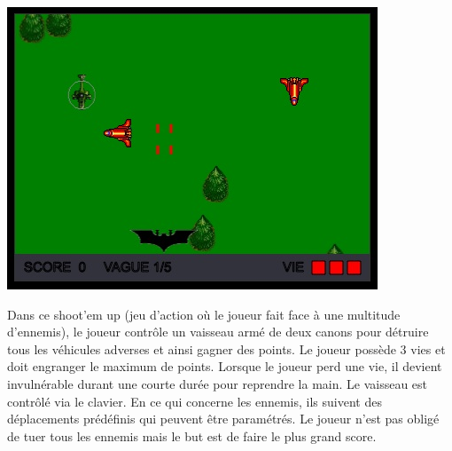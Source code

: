 \begin{minipage}{6cm}
\includegraphics[width=\linewidth]{img/capturejeu_1942}
\end{minipage}
\hfill
\begin{minipage}{9cm}
Dans ce shoot'em up (jeu d’action où le joueur fait face à une multitude d’ennemis), 
le joueur contrôle un vaisseau armé de deux canons pour détruire tous les véhicules adverses et ainsi gagner des points. 
Le joueur possède 3 vies et doit engranger le maximum de points. Lorsque le joueur perd une vie, il devient invulnérable durant une courte durée 
pour reprendre la main. Le vaisseau est contrôlé via le clavier. En ce qui concerne les ennemis, 
ils suivent des déplacements prédéfinis qui peuvent être paramétrés. 
Le joueur n’est pas obligé de tuer tous les ennemis mais le but est de faire le plus grand score.
\end{minipage}

